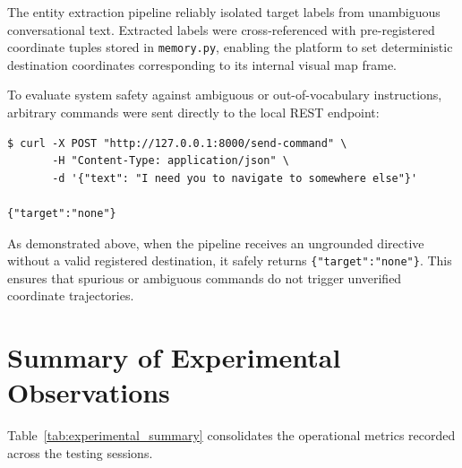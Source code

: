 The entity extraction pipeline reliably isolated target labels from unambiguous conversational text. Extracted labels were cross-referenced with pre-registered coordinate tuples stored in \texttt{memory.py}, enabling the platform to set deterministic destination coordinates corresponding to its internal visual map frame.

To evaluate system safety against ambiguous or out-of-vocabulary instructions, arbitrary commands were sent directly to the local REST endpoint:

\begin{verbatim}
$ curl -X POST "http://127.0.0.1:8000/send-command" \
       -H "Content-Type: application/json" \
       -d '{"text": "I need you to navigate to somewhere else"}'

{"target":"none"}
\end{verbatim}

As demonstrated above, when the pipeline receives an ungrounded directive without a valid registered destination, it safely returns \texttt{\{"target":"none"\}}. This ensures that spurious or ambiguous commands do not trigger unverified coordinate trajectories.

\section{Summary of Experimental Observations}
Table~\ref{tab:experimental_summary} consolidates the operational metrics recorded across the testing sessions.

